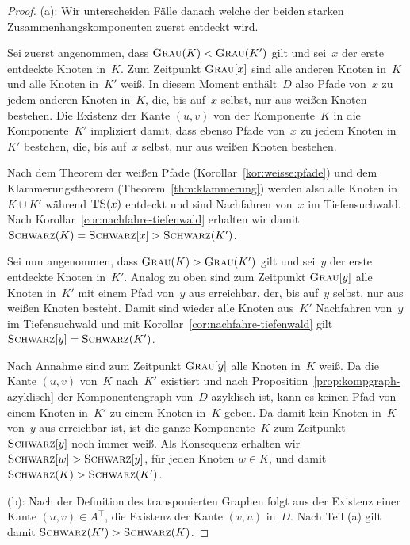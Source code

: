 \condclearpage

\begin{proof}
(a): Wir unterscheiden Fälle danach welche der beiden starken Zusammenhangskomponenten zuerst entdeckt wird.

Sei zuerst angenommen, dass $\mathop{\text{\textsc{Grau}}}(K) < \mathop{\text{\textsc{Grau}}}(K')$ gilt und sei~$x$ der erste entdeckte Knoten in~$K$.
Zum Zeitpunkt $\mathop{\text{\textsc{Grau}}}[x]$ sind alle anderen Knoten in~$K$ und alle Knoten in~$K'$ weiß.
In diesem Moment enthält~$D$ also Pfade von~$x$ zu jedem anderen Knoten in~$K$, die, bis auf~$x$ selbst, nur aus weißen Knoten bestehen.
Die Existenz der Kante $(u,v)$ von der Komponente~$K$ in die Komponente~$K'$ impliziert damit, dass ebenso Pfade von~$x$ zu jedem Knoten in~$K'$ bestehen, die, bis auf~$x$ selbst, nur aus weißen Knoten bestehen.

Nach dem Theorem der weißen Pfade (Korollar~\ref{kor:weisse:pfade}) und dem Klammerungstheorem (Theorem~\ref{thm:klammerung}) werden also alle Knoten in $K \cup K'$ während $\mathop{\text{\textsc{TS}}}(x)$ entdeckt und sind Nachfahren von~$x$ im Tiefensuchwald.
Nach Korollar~\ref{cor:nachfahre-tiefenwald} erhalten wir damit $\mathop{\text{\textsc{Schwarz}}}(K) = \mathop{\text{\textsc{Schwarz}}}[x] > \mathop{\text{\textsc{Schwarz}}}(K')$.

\condclearpage

Sei nun angenommen, dass $\mathop{\text{\textsc{Grau}}}(K) > \mathop{\text{\textsc{Grau}}}(K')$ gilt und sei~$y$ der erste entdeckte Knoten in~$K'$.
Analog zu oben sind zum Zeitpunkt $\mathop{\text{\textsc{Grau}}}[y]$ alle Knoten in~$K'$ mit einem Pfad von~$y$ aus erreichbar, der, bis auf~$y$ selbst, nur aus weißen Knoten besteht.
Damit sind wieder alle Knoten aus~$K'$ Nachfahren von~$y$ im Tiefensuchwald und mit Korollar~\ref{cor:nachfahre-tiefenwald} gilt $\mathop{\text{\textsc{Schwarz}}}[y] = \mathop{\text{\textsc{Schwarz}}}(K')$.

Nach Annahme sind zum Zeitpunkt $\mathop{\text{\textsc{Grau}}}[y]$ alle Knoten in~$K$ weiß.
Da die Kante $(u,v)$ von~$K$ nach~$K'$ existiert und nach Proposition~\ref{prop:kompgraph-azyklisch} der Komponentengraph von~$D$ azyklisch ist, kann es keinen Pfad von einem Knoten in~$K'$ zu einem Knoten in~$K$ geben.
Da damit kein Knoten in~$K$ von~$y$ aus erreichbar ist, ist die ganze Komponente~$K$ zum Zeitpunkt $\mathop{\text{\textsc{Schwarz}}}[y]$ noch immer weiß.
Als Konsequenz erhalten wir $\mathop{\text{\textsc{Schwarz}}}[w] > \mathop{\text{\textsc{Schwarz}}}[y]$, für jeden Knoten $w \in K$, und damit $\mathop{\text{\textsc{Schwarz}}}(K) > \mathop{\text{\textsc{Schwarz}}}(K')$.

\condclearpage

(b): Nach der Definition des transponierten Graphen folgt aus der Existenz einer Kante $(u,v) \in A^\top$, die Existenz der Kante $(v,u)$ in~$D$.
Nach Teil (a) gilt damit $\mathop{\text{\textsc{Schwarz}}}(K') > \mathop{\text{\textsc{Schwarz}}}(K)$.
\end{proof}

